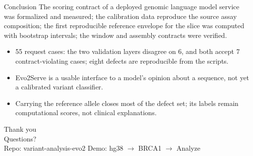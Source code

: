\documentclass[aspectratio=169,10pt]{beamer}
\begin{document}
\begin{frame}{Conclusion}
The scoring contract of a deployed genomic language model service was formalized and measured; the calibration data reproduce the source assay composition; the first reproducible reference envelope for the slice was computed with bootstrap intervals; the window and assembly contracts were verified.
\begin{itemize}\small
\item 55 request cases: the two validation layers disagree on 6, and both accept 7 contract-violating cases; eight defects are reproducible from the scripts.
\item Evo2Serve is a usable interface to a model's opinion about a sequence, not yet a calibrated variant classifier.
\item Carrying the reference allele closes most of the defect set; its labels remain computational scores, not clinical explanations.
\end{itemize}
\end{frame}

\begin{frame}
\centering
{\Large Thank you} \\[0.5em]
Questions? \\[0.5em]
{\small Repo: variant-analysis-evo2 \quad Demo: hg38 $\rightarrow$ BRCA1 $\rightarrow$ Analyze}
\end{frame}
\end{document}

